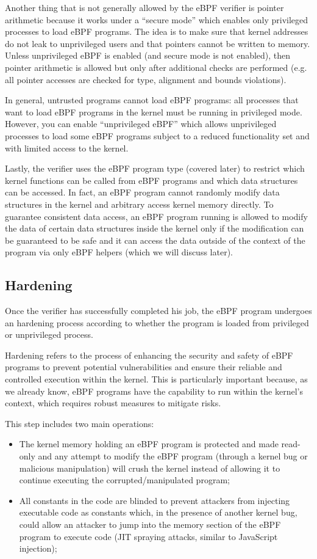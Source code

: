 Another thing that is not generally allowed by the eBPF verifier is pointer arithmetic because it works under a ``secure mode'' which enables only privileged processes to load eBPF programs.
The idea is to make sure that kernel addresses do not leak to unprivileged users and that pointers cannot be written to memory. 
Unless unprivileged eBPF is enabled (and secure mode is not enabled), then pointer arithmetic is allowed but only after additional checks are performed (e.g. all pointer accesses are checked for type, alignment and bounds violations).

In general, untrusted programs cannot load eBPF programs: all processes that want to load eBPF programs in the kernel must be running in privileged mode.
However, you can enable ``unprivileged eBPF'' which allows unprivileged processes to load some eBPF programs subject to a reduced functionality set and with limited access to the kernel.

Lastly, the verifier uses the eBPF program type (covered later) to restrict which kernel functions can be called from eBPF programs and which data structures can be accessed. 
In fact, an eBPF program cannot randomly modify data structures in the kernel and arbitrary access kernel memory directly.
To guarantee consistent data access, an eBPF program running is allowed to modify the data of certain data structures inside the kernel only if the modification can be guaranteed to be safe and it can access the data outside of the context of the program via only eBPF helpers (which we will discuss later).

\subsection{Hardening}

Once the verifier has successfully completed his job, the eBPF program undergoes an hardening process according to whether the program is loaded from privileged or unprivileged process.

Hardening refers to the process of enhancing the security and safety of eBPF programs to prevent potential vulnerabilities and ensure their reliable and controlled execution within the kernel. 
This is particularly important because, as we already know, eBPF programs have the capability to run within the kernel's context, which requires robust measures to mitigate risks.

This step includes two main operations:

\begin{itemize}
	\item The kernel memory holding an eBPF program is protected and made read-only
		and any attempt to modify the eBPF program (through a kernel bug or malicious manipulation) will crush the kernel instead of allowing it to continue executing the corrupted/manipulated program;
	\item All constants in the code are blinded to prevent attackers from injecting
		executable code as constants which, in the presence of another kernel bug, could allow an attacker to jump into the memory section of the eBPF program to execute code (JIT spraying attacks, similar to JavaScript injection);
\end{itemize}

